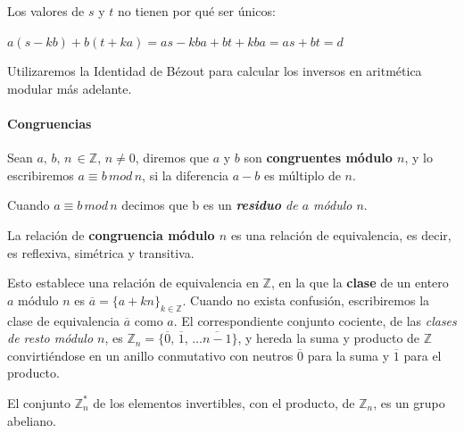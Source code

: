 \begin{remark}
	Los valores de $s$ y $t$ no tienen por qué ser únicos:
	
	${\displaystyle a(s-kb)+b(t+ka)=as-kba+bt+kba=as+bt = d}$
\end{remark}

\hfil

Utilizaremos la Identidad de Bézout para calcular los inversos en aritmética modular más adelante.

\hfil












\paragraph{Congruencias}

\begin{definition}
	Sean $a,\,b,\,n\,\in \mathbb{Z}$, $n \neq 0$, diremos que $a$ y $b$ son \textbf{congruentes módulo $n$}, y lo escribiremos $a \equiv b \, mod \, n$, si la diferencia $a - b$ es múltiplo de $n$.
\end{definition}

Cuando $a \equiv b \, mod \, n$ decimos que b es un \textit{\textbf{residuo} de $a$ módulo $n$}.

\begin{proposition}
	La relación de \textbf{congruencia módulo $n$} es una relación de equivalencia, es decir, es reflexiva, simétrica y transitiva.
\end{proposition}

Esto establece una relación de equivalencia en $\mathbb{Z}$, en la que la \textbf{clase} de un entero $a$ módulo $n$ es $\overline{a} = \{ a + kn \}_{k \in \mathbb{Z}}$. Cuando no exista confusión, escribiremos la clase de equivalencia $\overline{a}$ como $a$.
El correspondiente conjunto cociente, de las \textit{clases de resto módulo $n$}, es $\mathbb{Z}_n = \{\overline{0},\,\overline{1},\,\dots\overline{n-1}\}$, y hereda la suma y producto de $\mathbb{Z}$ convirtiéndose en un anillo conmutativo con neutros $\overline{0}$ para la suma y $\overline{1}$ para el producto.

\begin{proposition}
	El conjunto $\mathbb{Z}_n^*$ de los elementos invertibles, con el producto, de $\mathbb{Z}_n$, es un grupo abeliano.
\end{proposition}


